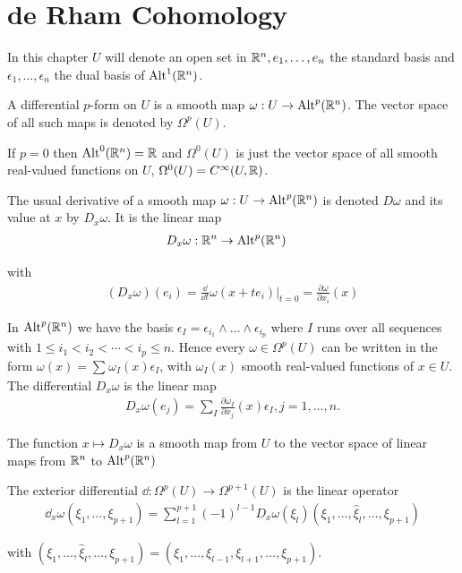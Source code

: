 \chapter{de Rham Cohomology}
In this chapter $U$ will denote an open set in ${\mathbb{R}}^n, {e_1,\ldots, e_n}$ the standard basis
and ${\epsilon_1, \ldots,\epsilon_n}$ the dual basis of $\operatorname{Alt}^1({\mathbb{R}}^n)$.

\begin{definition}
  A differential $p$-form on $U$ is a smooth map $\omega:U\to \operatorname{Alt}^p({\mathbb{R}}^n)$.
The vector space of all such maps is denoted by $\Omega^p(U)$.
\end{definition}

If $p = 0$ then $\operatorname{Alt}^0({\mathbb{R}}^n) = {\mathbb{R}}$ and $\Omega^0(U)$ is just the vector space of all smooth
real-valued functions on $U$, $\Omega^0(U) = C^\infty(U, {\mathbb{R}})$.

The usual derivative of a smooth map $\omega:U\to\operatorname{Alt}^p({\mathbb{R}}^n)$ is denoted $D\omega$ and its
value at $x$ by $D_x\omega$. It is the linear map
\begin{align*}
  D_x\omega:{\mathbb{R}}^n &\to \operatorname{Alt}^p({\mathbb{R}}^n)
\end{align*}

with 
\begin{align*}
  (D_x\omega)(e_i) 
  = \frac{\dd }{\dd t}\omega(x+te_i)\Big|_{t=0}
  = \frac{\partial \omega}{\partial x_i}(x)
\end{align*}

In $\operatorname{Alt}^p({\mathbb{R}}^n)$ we have the basis $\epsilon_I=\epsilon_{i_1}\wedge\ldots\wedge\epsilon_{i_p}$ where 
$I$ runs over all sequences with $1\le i_1<i_2<\cdots<i_p\le n$. Hence every $\omega\in\Omega^p(U)$ 
can be written in the form $\omega(x) = \sum_{}^{}{\omega_I(x)\epsilon_I}$, with $\omega_I(x)$ smooth 
real-valued functions of $x\in U$. The differential $D_x\omega$ is the linear map
\begin{align}\label{eq:3-1}
  D_{x}\omega(e_{j})=\sum_{I}\frac{\partial\omega_{I}}{\partial x_{j}}(x)\epsilon_{I} , j=1,\ldots,n.
\end{align}

The function $x\mapsto D_x\omega$ is a smooth map from $U$ to the vector space of linear
maps from ${\mathbb{R}}^n$ to $\operatorname{Alt}^p({\mathbb{R}}^n)$


\begin{definition}\label{definition:3-2}
  The exterior differential $\dd:\Omega^p(U)\to \Omega^{p+1}(U)$ is 
  the linear operator
  \begin{align*}
    \dd_x\omega(\xi_1,\ldots,\xi_{p+1})
    = \sum_{l=1}^{p+1}\left(-1\right)^{l-1}D_x\omega(\xi_l)(\xi_1,\ldots,\hat{\xi}_l,\ldots,\xi_{p+1})
  \end{align*}

  with $(\xi_1,\ldots,\hat{\xi}_l,\ldots,\xi_{p+1}) = (\xi_1, \ldots, \xi_{l-1}, \xi_{l+1}, \ldots, \xi_{p+1})$.
\end{definition}


